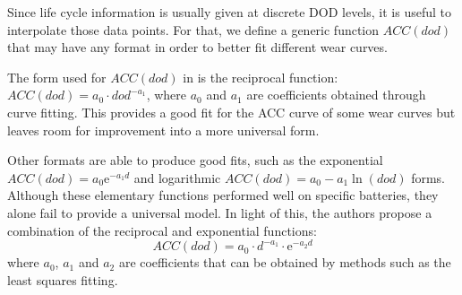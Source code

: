 \documentclass{ieeeaccess}
\begin{document}
    Since life cycle information is usually given at discrete \ac{DOD} levels, it is useful to interpolate those data points. For that, we define a generic function $ACC(dod)$ that may have any format in order to better fit different wear curves.
    
    The form used for $ACC(dod)$ in \cite{HAN2014} is the reciprocal function: $ACC(dod) = a_{0} \cdot dod^{-a_{1}}$, where $a_{0}$ and $a_{1}$ are coefficients obtained through curve fitting. This provides a good fit for the \ac{ACC} curve of some wear curves but leaves room for improvement into a more universal form.
    
    Other formats are able to produce good fits, such as the exponential $ACC(dod) = a_0 \mathrm{e}^{-a_1 d}$ and logarithmic $ACC(dod) = a_0 - a_1 \ln(dod)$ forms. Although these elementary functions performed well on specific batteries, they alone fail to provide a universal model. In light of this, the authors propose a combination of the reciprocal and exponential functions:
    \begin{equation}
    	ACC(dod) = a_0 \cdot d^{-a_1} \cdot \mathrm{e}^{-a_2 d}
    	\label{eq:ACC(dod)}
    \end{equation}
    where $a_0$, $a_1$ and $a_2$ are coefficients that can be obtained by methods such as the least squares fitting.
    
\end{document}
